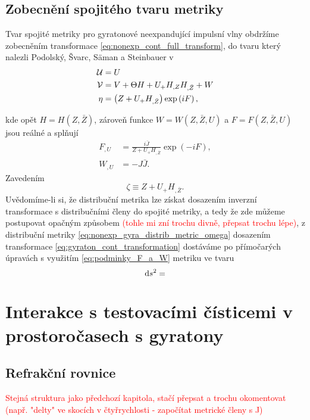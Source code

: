 \subsection{Zobecnění spojitého tvaru metriky}
Tvar spojité metriky pro gyratonové neexpandující impulsní vlny obdržíme zobecněním transformace \eqref{eq:nonexp_cont_full_transform},
do tvaru který nalezli Podolský, Švarc, Säman a Steinbauer v \cite{Podolsky_2017}
\begin{equation}
    \label{eq:gyraton_cont_transformation}
    \begin{split}
        \mathcal{U} &= U \\
        \mathcal{V} &= V + \Theta H + U_{+} H_{,Z} H_{,\bar{Z}} + W \\
        \eta &= \left(Z + U_{+} H_{,\bar{Z}}\right) \exp \left(i F \right),
    \end{split}
\end{equation}

kde opět $H = H(Z, \bar{Z})$, zároveň funkce $W = W(Z, \bar{Z}, U)$ a $F = F(Z, \bar{Z}, U)$ jsou reálné a splňují
\begin{equation}
    \label{eq:podminky_F_a_W}
    \begin{split}
        F_{,U} &= \frac{i\bar{J}}{Z + U_{+}H_{,\bar{Z}}} \exp{\left(-iF\right)}, \\
        W_{,U} &= -J \bar{J}.
    \end{split}
\end{equation}
Zavedením
\begin{equation}
    \zeta \equiv Z + U_{+} H_{,\bar{Z}}.
\end{equation}
Uvědomíme-li si, že distribuční metrika lze získat dosazením inverzní transformace s distribučními členy do spojité metriky,
a tedy že zde můžeme postupovat opačným způsobem \textcolor{red}{(tohle mi zní trochu divně, přepsat trochu lépe)}, z distribuční metriky \eqref{eq:nonexp_gyra_distrib_metric_omega} dosazením transformace
\eqref{eq:gyraton_cont_transformation} dostáváme po přímočarých úpravách s využitím \eqref{eq:podminky_F_a_W} metriku ve tvaru
\begin{equation}
    \label{eq:spojita_gyratonova_metrika}
    \mathrm{d} s^2 = 
\end{equation}


\section{Interakce s testovacími čísticemi v prostoročasech s gyratony}
\subsection{Refrakční rovnice}
\textcolor{red}{Stejná struktura jako předchozí kapitola, stačí přepsat a trochu okomentovat
(např. "delty" ve skocích v čtyřrychlosti - započítat metrické členy s J)}